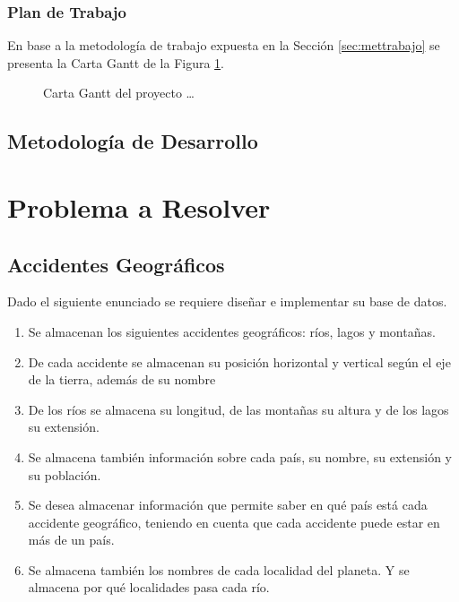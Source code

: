 \documentclass[letter,12pt]{report}
\begin{document}
\begin{landscape}
\subsection{Plan de Trabajo}
En base a la metodología de trabajo expuesta en la Sección \ref{sec:mettrabajo} se presenta la Carta Gantt de la Figura \ref{f:gantt}.

\begin{figure}[hbt]
\centering
  \caption{Carta Gantt del proyecto \dots}
  \label{f:gantt}
\end{figure}
\end{landscape}

\section{Metodología de Desarrollo}

\chapter{Problema a Resolver}
\section{Accidentes Geográficos}\label{s:enunciado}
Dado el siguiente enunciado se requiere diseñar e implementar su base de datos.

\begin{enumerate}\justifying
\item\label{i:1} Se almacenan los siguientes accidentes geográficos: ríos, lagos y montañas.
\item\label{i:2} De cada accidente se almacenan su posición horizontal y vertical según el eje de la tierra, además de su nombre
\item\label{i:3} De los ríos se almacena su longitud, de las montañas su altura y de los lagos su extensión.
\item\label{i:4} Se almacena también información sobre cada país, su nombre, su extensión y su población.
\item\label{i:5} Se desea almacenar información que permite saber en qué país está cada accidente geográfico, teniendo en cuenta que cada accidente puede estar en más de un país.
\item\label{i:6} Se almacena también los nombres de cada localidad del planeta. Y se almacena por qué localidades pasa cada río.
\end{enumerate}
\end{document}
